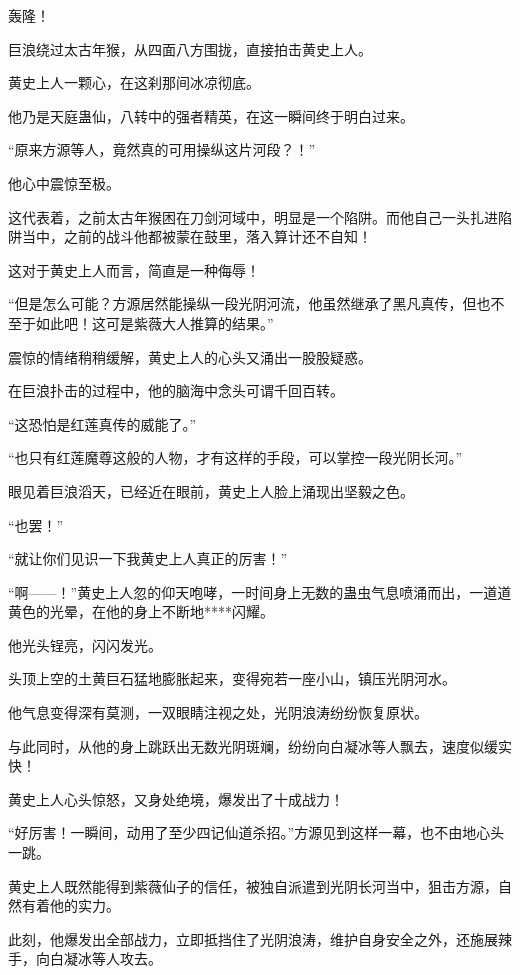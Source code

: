
\begin{this_body}

轰隆！

巨浪绕过太古年猴，从四面八方围拢，直接拍击黄史上人。

黄史上人一颗心，在这刹那间冰凉彻底。

他乃是天庭蛊仙，八转中的强者精英，在这一瞬间终于明白过来。

“原来方源等人，竟然真的可用操纵这片河段？！”

他心中震惊至极。

这代表着，之前太古年猴困在刀剑河域中，明显是一个陷阱。而他自己一头扎进陷阱当中，之前的战斗他都被蒙在鼓里，落入算计还不自知！

这对于黄史上人而言，简直是一种侮辱！

“但是怎么可能？方源居然能操纵一段光阴河流，他虽然继承了黑凡真传，但也不至于如此吧！这可是紫薇大人推算的结果。”

震惊的情绪稍稍缓解，黄史上人的心头又涌出一股股疑惑。

在巨浪扑击的过程中，他的脑海中念头可谓千回百转。

“这恐怕是红莲真传的威能了。”

“也只有红莲魔尊这般的人物，才有这样的手段，可以掌控一段光阴长河。”

眼见着巨浪滔天，已经近在眼前，黄史上人脸上涌现出坚毅之色。

“也罢！”

“就让你们见识一下我黄史上人真正的厉害！”

“啊——！”黄史上人忽的仰天咆哮，一时间身上无数的蛊虫气息喷涌而出，一道道黄色的光晕，在他的身上不断地****闪耀。

他光头锃亮，闪闪发光。

头顶上空的土黄巨石猛地膨胀起来，变得宛若一座小山，镇压光阴河水。

他气息变得深有莫测，一双眼睛注视之处，光阴浪涛纷纷恢复原状。

与此同时，从他的身上跳跃出无数光阴斑斓，纷纷向白凝冰等人飘去，速度似缓实快！

黄史上人心头惊怒，又身处绝境，爆发出了十成战力！

“好厉害！一瞬间，动用了至少四记仙道杀招。”方源见到这样一幕，也不由地心头一跳。

黄史上人既然能得到紫薇仙子的信任，被独自派遣到光阴长河当中，狙击方源，自然有着他的实力。

此刻，他爆发出全部战力，立即抵挡住了光阴浪涛，维护自身安全之外，还施展辣手，向白凝冰等人攻去。


\end{this_body}
